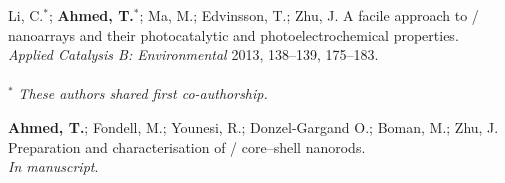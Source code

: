 \documentclass[webedition,openright,titles,swedish,english]{LuaUUThesis}\usepackage[]{graphicx}\usepackage[]{xcolor}
\begin{document}
\begingroup
\let\cleardoublepage\relax
%

\begin{listofpapers}
   \item \label{P1} %
   Li, C.$^\ast$; \textbf{Ahmed, T.}$^\ast$; Ma, M.; Edvinsson, T.; Zhu, J. %
   A facile approach to / nanoarrays and their photocatalytic %
   and photo\-electro\-chemical properties.\\%
   \emph{Applied Catalysis B: Environmental} 2013, 138--139, 175--183.\\%
   \\%
   $^\ast$ \emph{These authors shared first co-authorship.}
      \bgroup
      \captionsetup{type=figureP1}
      \label{fig:01P-pxrd-diffractograms}
      \label{fig:01P-raman}
      \label{fig:01P-sem-nopulse}
      \label{fig:01P-sem-pulse}
      \label{fig:01P-tem-eds}
      \label{fig:01P-abs-tauc}
      \label{fig:01P-photoluminescence}
      \label{fig:01P-JV}
      \label{fig:01P-pc-abs}
      \egroup
   \item \label{P2} %
   \textbf{Ahmed, T.}; Fondell, M.; Younesi, R.; Donzel-Gargand O.; Boman, M.; Zhu, J. %
   Preparation and characterisation of / core--shell nanorods.\\%
   \emph{In manuscript}.
      \bgroup
      \captionsetup{type=figureP2}

\end{listofpapers}
\end{document}
